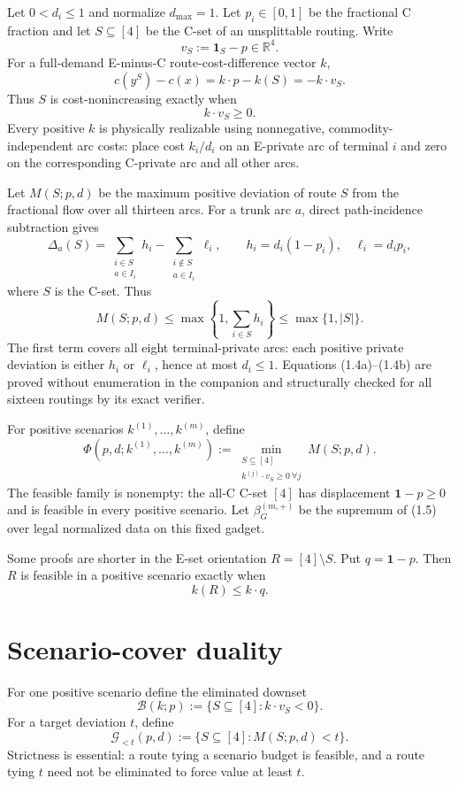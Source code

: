 \documentclass[11pt]{article}
\theoremstyle{remark}
\newcommand{\R}{\mathbb{R}}
\newcommand{\one}{\mathbf{1}}
\newcommand{\good}{\mathcal{G}}
\newcommand{\bad}{\mathcal{B}}
\begin{document}
Let $0<d_i\le1$ and normalize $d_{\max}=1$. Let $p_i\in[0,1]$ be the
fractional C fraction and
let $S\subseteq[4]$ be the C-set of an unsplittable routing. Write
\[
v_S:=\one_S-p\in\R^4.
\tag{1.2}
\]
For a full-demand E-minus-C route-cost-difference vector $k$,
\[
c(y^S)-c(x)=k\cdot p-k(S)=-k\cdot v_S.
\tag{1.3}
\]
Thus $S$ is cost-nonincreasing exactly when
\[
k\cdot v_S\ge0.
\tag{1.4}
\]
Every positive $k$ is physically realizable using nonnegative,
commodity-independent arc costs: place cost $k_i/d_i$ on an E-private arc of
terminal $i$ and zero on the corresponding C-private arc and all other arcs.

Let $M(S;p,d)$ be the maximum positive deviation of route $S$ from the
fractional flow over all thirteen arcs.
For a trunk arc $a$, direct path-incidence subtraction gives
\[
\Delta_a(S)=
\sum_{\substack{i\in S\\a\in I_i}}h_i
-\sum_{\substack{i\notin S\\a\in I_i}}\ell_i,
\qquad
h_i=d_i(1-p_i),\quad \ell_i=d_ip_i,
\tag{1.4a}
\]
where $S$ is the C-set. Thus
\[
M(S;p,d)\le
\max\left\{1,\sum_{i\in S}h_i\right\}
\le\max\{1,|S|\}.
\tag{1.4b}
\]
The first term covers all eight terminal-private arcs: each positive private
deviation is either $h_i$ or $\ell_i$, hence at most $d_i\le1$. Equations
(1.4a)--(1.4b) are proved without enumeration in the companion
and structurally checked for all sixteen routings by its exact verifier.

For positive scenarios $k^{(1)},\ldots,k^{(m)}$, define
\[
\Phi(p,d;k^{(1)},\ldots,k^{(m)})
:=\min_{\substack{S\subseteq[4]\\k^{(j)}\cdot v_S\ge0\ \forall j}}
M(S;p,d).
\tag{1.5}
\]
The feasible family is nonempty: the all-C C-set $[4]$ has displacement
$\one-p\ge0$ and is feasible in every positive scenario.
Let $\beta_G^{(m,+)}$ be the supremum of (1.5) over legal normalized data
on this fixed gadget.

Some proofs are shorter in the E-set orientation $R=[4]\setminus S$. Put
$q=\one-p$. Then $R$ is feasible in a positive scenario exactly when
\[
k(R)\le k\cdot q.
\tag{1.6}
\]

\section{Scenario-cover duality}

For one positive scenario define the eliminated downset
\[
\bad(k;p):=\{S\subseteq[4]:k\cdot v_S<0\}.
\tag{2.1}
\]
For a target deviation $t$, define
\[
\good_{<t}(p,d):=\{S\subseteq[4]:M(S;p,d)<t\}.
\tag{2.2}
\]
Strictness is essential: a route tying a scenario budget is feasible, and a
route tying $t$ need not be eliminated to force value at least $t$.
\end{document}
